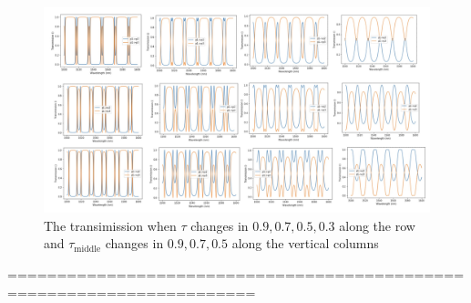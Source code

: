 \documentclass[fontsize=11pt]{scrartcl}
\begin{document}
\begin{figure}[H]
    \centering
    \includegraphics[width=1\textwidth]{img/fig3.3.png}
    \caption{The transimission when $\tau$ changes in $0.9, 0.7, 0.5, 0.3$
    along the row and $\tau_{\mathrm{middle}}$ changes in $0.9, 0.7, 0.5$ along
    the vertical columns}
    \label{fig3.2}
\end{figure}

\pagebreak
=======================================================================
\end{document}
